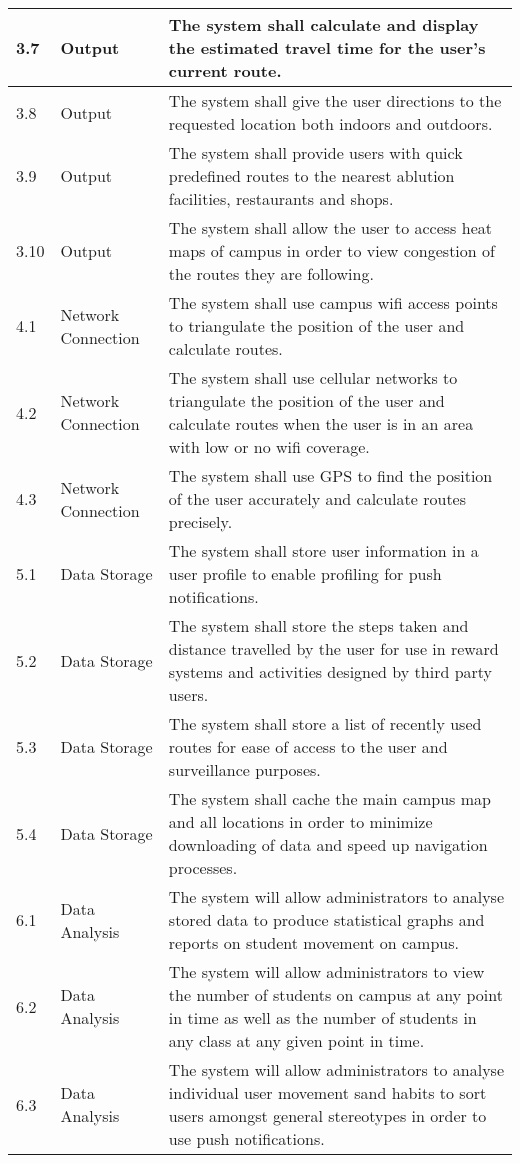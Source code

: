 \documentclass[12pt,a4paper]{report}
\begin{document}
\begin{longtable}{|p{}| p{} | p{} |}
\hline
3.7& Output & The system shall calculate and display the estimated travel time for the user's current route.\\
\hline
3.8& Output & The system shall give the user directions to the requested location both indoors and outdoors.\\
\hline
3.9& Output& The system shall provide users with quick predefined routes to the nearest ablution facilities, restaurants and shops.\\
\hline
3.10& Output& The system shall allow the user to access heat maps of campus in order to view congestion of the routes they are following.\\
\hline
4.1& Network Connection & The system shall use campus wifi access points to triangulate the position of the user and calculate routes.  \\
\hline
4.2& Network Connection & The system shall use cellular networks to triangulate the position of the user and calculate routes when the user is in an area with low or no wifi coverage.\\
\hline
4.3& Network Connection & The system shall use GPS to find the position of the user accurately and calculate routes precisely.\\
\hline
5.1& Data Storage & The system shall store user information in a user profile to enable profiling for push notifications.\\
\hline
5.2& Data Storage & The system shall store the steps taken and distance travelled by the user for use in reward systems and activities designed by third party users.\\
\hline
5.3& Data Storage & The system shall store a list of recently used routes for ease of access to the user and surveillance purposes.\\
\hline
5.4& Data Storage & The system shall cache the main campus map and all locations in order to minimize downloading of data and speed up navigation processes.\\
\hline
6.1& Data Analysis & The system will allow administrators to analyse stored data to produce statistical graphs and reports on student movement on campus.\\
\hline
6.2& Data Analysis & The system will allow administrators to view the number of students on campus at any point in time as well as the number of students in any class at any given point in time.\\
\hline
6.3& Data Analysis & The system will allow administrators to analyse individual user movement sand habits to sort users amongst general stereotypes in order to use push notifications.\\

\end{longtable}
\end{document}
